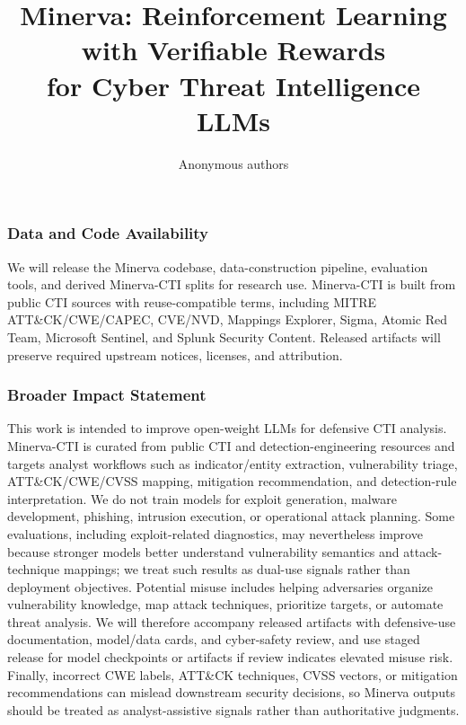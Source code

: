 \documentclass[10pt]{article}
\title{Minerva: Reinforcement Learning with Verifiable Rewards \\for Cyber Threat Intelligence LLMs}
\author{Anonymous authors}
\theoremstyle{plain}
\theoremstyle{definition}
\theoremstyle{remark}
\begin{document}
\maketitle













\subsubsection*{Data and Code Availability}

We will release the Minerva codebase, data-construction pipeline, evaluation tools, and derived Minerva-CTI splits for research use.
Minerva-CTI is built from public CTI sources with reuse-compatible terms, including MITRE ATT\&CK/CWE/CAPEC, CVE/NVD, Mappings Explorer, Sigma, Atomic Red Team, Microsoft Sentinel, and Splunk Security Content.
Released artifacts will preserve required upstream notices, licenses, and attribution.

\subsubsection*{Broader Impact Statement}

This work is intended to improve open-weight LLMs for defensive CTI analysis.
Minerva-CTI is curated from public CTI and detection-engineering resources and targets analyst workflows such as indicator/entity extraction, vulnerability triage, ATT\&CK/CWE/CVSS mapping, mitigation recommendation, and detection-rule interpretation.
We do not train models for exploit generation, malware development, phishing, intrusion execution, or operational attack planning.
Some evaluations, including exploit-related diagnostics, may nevertheless improve because stronger models better understand vulnerability semantics and attack-technique mappings; we treat such results as dual-use signals rather than deployment objectives.
Potential misuse includes helping adversaries organize vulnerability knowledge, map attack techniques, prioritize targets, or automate threat analysis.
We will therefore accompany released artifacts with defensive-use documentation, model/data cards, and cyber-safety review, and use staged release for model checkpoints or artifacts if review indicates elevated misuse risk.
Finally, incorrect CWE labels, ATT\&CK techniques, CVSS vectors, or mitigation recommendations can mislead downstream security decisions, so Minerva outputs should be treated as analyst-assistive signals rather than authoritative judgments.




\clearpage

\appendix











\end{document}
